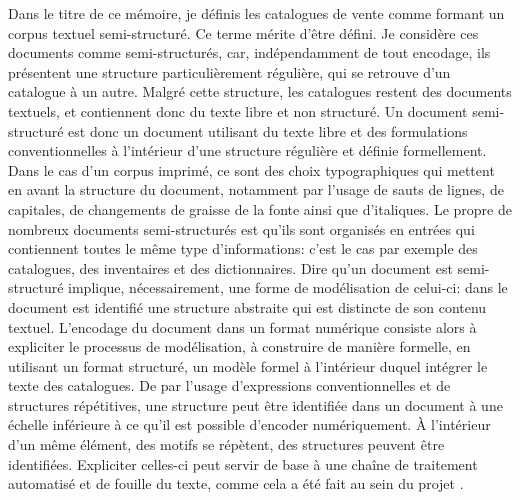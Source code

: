 Dans le titre de ce mémoire, je définis les catalogues de vente comme formant un corpus textuel semi-structuré. Ce terme mérite d'être défini. Je considère ces documents comme semi-structurés, car, indépendamment de tout encodage, ils présentent une structure particulièrement régulière, qui se retrouve d'un catalogue à un autre. Malgré cette structure, les catalogues restent des documents textuels, et contiennent donc du texte libre et non structuré. Un document semi-structuré est donc un document utilisant du texte libre et des formulations conventionnelles à l'intérieur d'une structure régulière et définie formellement. Dans le cas d'un corpus imprimé, ce sont des choix typographiques qui mettent en avant la structure du document, notamment par l'usage de sauts de lignes, de capitales, de changements de graisse de la fonte ainsi que d'italiques. Le propre de nombreux documents semi-structurés est qu'ils sont organisés en entrées qui contiennent toutes le même type d'informations: c'est le cas par exemple des catalogues, des inventaires et des dictionnaires. Dire qu'un document est semi-structuré implique, nécessairement, une forme de modélisation de celui-ci: dans le document est identifié une structure abstraite qui est distincte de son contenu textuel. L'encodage du document dans un format numérique consiste alors à expliciter le processus de modélisation, à construire de manière formelle, en utilisant un format structuré, un modèle formel à l'intérieur duquel intégrer le texte des catalogues. De par l'usage d'expressions conventionnelles et de structures répétitives, une structure peut être identifiée dans un document à une échelle inférieure à ce qu'il est possible d'encoder numériquement. À l'intérieur d'un même élément, des motifs se répètent, des structures peuvent être identifiées. Expliciter celles-ci peut servir de base à une chaîne de traitement automatisé et de fouille du texte, comme cela a été fait au sein du projet \mssktb{}.

